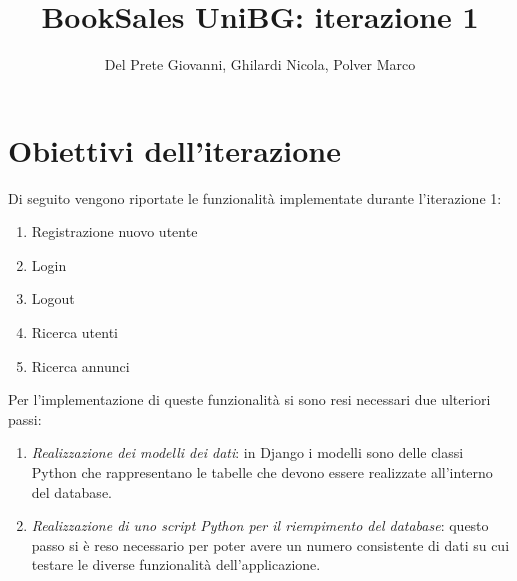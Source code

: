 \documentclass[10pt,a4paper]{report}
\author{Del Prete Giovanni, Ghilardi Nicola, Polver Marco}
\title{BookSales UniBG: iterazione 1}
\begin{document}
	
	\maketitle
	\tableofcontents
	
	\section{Obiettivi dell'iterazione}
	Di seguito vengono riportate le funzionalità implementate durante l'iterazione 1:
	\begin{enumerate}
		\item Registrazione nuovo utente
		\item Login
		\item Logout
		\item Ricerca utenti
		\item Ricerca annunci
	\end{enumerate}
	Per l'implementazione di queste funzionalità si sono resi necessari due ulteriori passi:
	\begin{enumerate}
		\item \textit{Realizzazione dei modelli dei dati}: in Django i modelli sono delle classi Python che rappresentano le tabelle che devono essere realizzate all'interno del database.
		\item \textit{Realizzazione di uno script Python per il riempimento del database}: questo passo si è reso necessario per poter avere un numero consistente di dati su cui testare le diverse funzionalità dell'applicazione.
	\end{enumerate}
\end{document}
